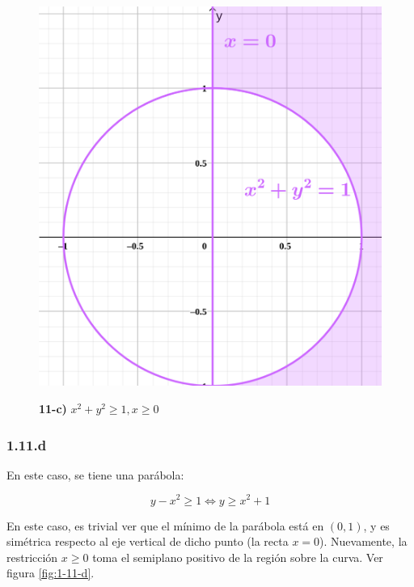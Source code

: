 \documentclass{article}
\begin{document}
\begin{figure}[ht]
\caption{\textbf{11-c)} $x^2 + y^2 \geq 1, x \geq 0$}
\includegraphics[scale=1.85]{img/ejercicios/1/11-c.png} 
\centering
\label{fig:1-11-c}
\end{figure}

\subsubsection*{1.11.d}
\label{subsubsec:1.11.d}

En este caso, se tiene una parábola:

\begin{equation}
y - x^2 \geq 1 \Leftrightarrow y \geq x^2 + 1
\end{equation}

En este caso, es trivial ver que el mínimo de la parábola está en $(0, 1)$, y es simétrica respecto al eje vertical de dicho punto (la recta $x = 0$). Nuevamente, la restricción $x \geq 0$ toma el semiplano positivo de la región sobre la curva. Ver figura \ref{fig:1-11-d}.
\end{document}
